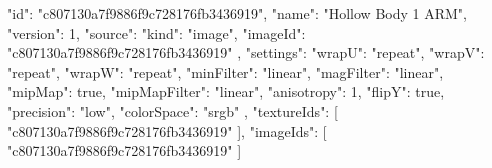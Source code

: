 {
  "id": "c807130a7f9886f9c728176fb3436919",
  "name": "Hollow Body 1 ARM",
  "version": 1,
  "source": {
    "kind": "image",
    "imageId": "c807130a7f9886f9c728176fb3436919"
  },
  "settings": {
    "wrapU": "repeat",
    "wrapV": "repeat",
    "wrapW": "repeat",
    "minFilter": "linear",
    "magFilter": "linear",
    "mipMap": true,
    "mipMapFilter": "linear",
    "anisotropy": 1,
    "flipY": true,
    "precision": "low",
    "colorSpace": "srgb"
  },
  "textureIds": [
    "c807130a7f9886f9c728176fb3436919"
  ],
  "imageIds": [
    "c807130a7f9886f9c728176fb3436919"
  ]
}
